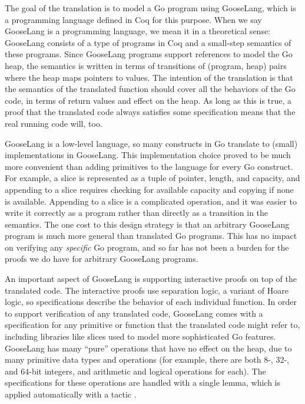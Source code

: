 The goal of the translation is to model a Go program using GooseLang,
which is a programming language defined in Coq for this purpose. When we
say GooseLang is a programming language, we mean it in a theoretical
sense: GooseLang consists of a type of programs in Coq and a small-step
semantics of these programs. Since GooseLang programs support references
to model the Go heap, the semantics is written in terms of transitions
of (program, heap) pairs where the heap maps pointers to values. The
intention of the translation is that the semantics of the translated
function should cover all the behaviors of the Go code, in terms of
return values and effect on the heap. As long as this is true, a proof
that the translated code always satisfies some specification means that
the real running code will, too.

GooseLang is a low-level language, so many constructs in Go translate to
(small) implementations in GooseLang. This implementation choice proved
to be much more convenient than adding primitives to the language for
every Go construct. For example, a slice is represented as a tuple of
pointer, length, and capacity, and appending to a slice requires
checking for available capacity and copying if none is available.
Appending to a slice is a complicated operation, and it was easier to
write it correctly as a program rather than directly as a transition in
the semantics. The one cost to this design strategy is that an arbitrary
GooseLang program is much more general than translated Go programs. This
has no impact on verifying any \emph{specific} Go program, and so far
has not been a burden for the proofs we do have for arbitrary GooseLang
programs.

An important aspect of GooseLang is supporting interactive proofs on top
of the translated code. The interactive proofs use separation logic, a
variant of Hoare logic, so specifications describe the behavior of each
individual function. In order to support verification of any translated
code, GooseLang comes with a specification for any primitive or function
that the translated code might refer to, including libraries like slices
used to model more sophisticated Go features. GooseLang has many
``pure'' operations that have no effect on the heap, due to many
primitive data types and operations (for example, there are both 8-,
32-, and 64-bit integers, and arithmetic and logical operations for
each). The specifications for these operations are handled with a single
lemma, which is applied automatically with a tactic .

